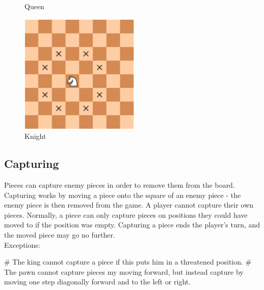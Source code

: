 \documentclass{article}
\begin{document}
\begin{figure}[!htb]
  \caption{Queen}\label{fig:chess5}
\endminipage\hfill
{}%
  \includegraphics[width=\linewidth]{chess6}
  \caption{Knight}\label{fig:chess6}
\endminipage
\end{figure}

\subsection*{Capturing}

Pieces can capture enemy pieces in order to remove them from the board. Capturing works by moving a piece onto the square of an enemy piece - the enemy piece is then removed from the game. A player cannot capture their own pieces. Normally, a piece can only capture pieces on positions they could have moved to if the position was empty. Capturing a piece ends the player's turn, and the moved piece may go no further.\\

\noindent
Exceptions:

\begin{easylist}[itemize]
# The king cannot capture a piece if this puts him in a threatened position.
# The pawn cannot capture pieces my moving forward, but instead capture by moving one step diagonally forward and to the left or right.
\end{easylist}
\end{document}
